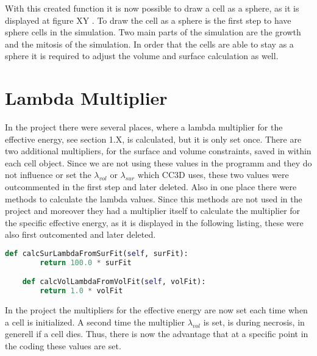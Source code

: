 With this created function it is now possible to draw a cell as a sphere, as it is displayed at figure XY \cite{XY}. \newline To draw the cell as a sphere is the first step to have sphere cells in the simulation. Two main parts of the simulation are the growth and the mitosis of the simulation. In order that the cells are able to stay as a sphere it is required to adjust the volume and surface calculation as well.

\section{Lambda Multiplier}
In the project there were several places, where a lambda multiplier for the effective energy, see section 1.X, is calculated, but it is only set once. There are two additional multipliers, for the surface and volume constraints, saved in within each cell object. Since we are not using these values in the programm and they do not influence or set the $\lambda_{vol}$ or $\lambda_{sur}$ which \ac{CC3D} uses, these two values were outcommented in the first step and later deleted. \newline 
Also in one place there were methods to calculate the lambda values. Since this methods are not used in the project and moreover they had a multiplier itself to calculate the multiplier for the specific effective energy, as it is displayed in the following listing, these were also first outcomented and later deleted.
\begin{lstlisting}[language=Python, caption= methods to calculate the $\lambda_{vol}$ and $\lambda_{sur}$ for the effective energy]
    def calcSurLambdaFromSurFit(self, surFit):
        return 100.0 * surFit

    def calcVolLambdaFromVolFit(self, volFit):
        return 1.0 * volFit
\end{lstlisting}

In the project the multipliers for the effective energy are now set each time when a cell is initialized. A second time the multiplier $\lambda_{vol}$ is set, is during necrosis, in generell if a cell dies. Thus, there is now the advantage that at a specific point in the coding these values are set.




